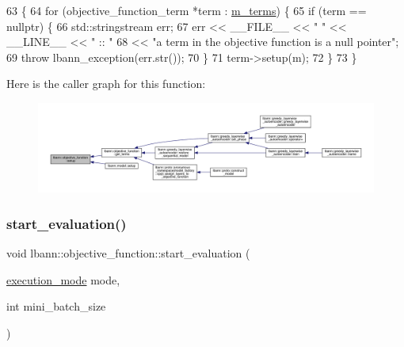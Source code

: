 \begin{DoxyCode}
63                                        \{
64   \textcolor{keywordflow}{for} (objective\_function\_term *term : \hyperlink{classlbann_1_1objective__function_aea9c1f90ba9af1b1330efa2ba6adb5e2}{m\_terms}) \{
65     \textcolor{keywordflow}{if} (term == \textcolor{keyword}{nullptr}) \{
66       std::stringstream err;
67       err << \_\_FILE\_\_ << \textcolor{stringliteral}{" "} << \_\_LINE\_\_ << \textcolor{stringliteral}{" :: "}
68           << \textcolor{stringliteral}{"a term in the objective function is a null pointer"};
69       \textcolor{keywordflow}{throw} lbann\_exception(err.str());
70     \}
71     term->setup(m);
72   \}
73 \}
\end{DoxyCode}
Here is the caller graph for this function\+:\nopagebreak
\begin{figure}[H]
\begin{center}
\leavevmode
\includegraphics[width=350pt]{classlbann_1_1objective__function_ac14bb274978e0a5182122fd179579878_icgraph}
\end{center}
\end{figure}
\mbox{\label{classlbann_1_1objective__function_a3edb6708894d31ec2a014c6eb8a61df2}} 
\subsubsection{\texorpdfstring{start\+\_\+evaluation()}{start\_evaluation()}}
{\footnotesize\ttfamily void lbann\+::objective\+\_\+function\+::start\+\_\+evaluation (\begin{DoxyParamCaption}\item[{\hyperlink{base_8hpp_a2781a159088df64ed7d47cc91c4dc0a8}{execution\+\_\+mode}}]{mode,  }\item[{int}]{mini\+\_\+batch\+\_\+size }\end{DoxyParamCaption})}

